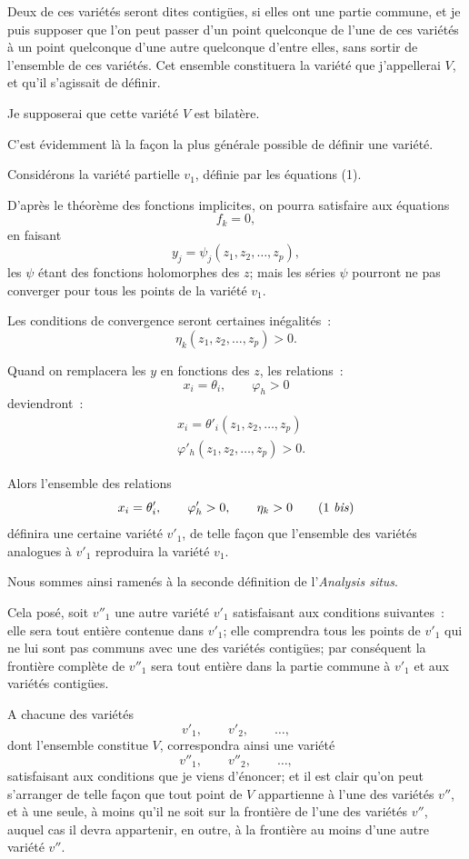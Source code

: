 \documentclass{article}
\begin{document}
Deux de ces variétés seront dites contigües, si elles ont une partie commune, et je puis supposer que l'on peut passer d'un point quelconque de l'une de ces variétés à un point quelconque d'une autre quelconque d'entre elles, sans sortir de l'ensemble de ces variétés. Cet ensemble constituera la variété que j'appellerai $V$, et qu'il s'agissait de définir.

Je supposerai que cette variété $V$ est bilatère.

C'est évidemment là la façon la plus générale possible de définir une variété.

Considérons la variété partielle $v_{1}$, définie par les équations (1).

D'après le théorème des fonctions implicites, on pourra satisfaire aux équations
\[ f_{k} = 0, \]
en faisant
\[ y_{j} = \psi_{j}(z_{1}, z_{2}, \ldots, z_{p}), \]
les $\psi$ étant des fonctions holomorphes des $z$; mais les séries $\psi$ pourront ne pas converger pour tous les points de la variété $v_{1}$.

Les conditions de convergence seront certaines inégalités~:
\[ \eta_{k}(z_{1}, z_{2}, \ldots, z_{p}) > 0. \]

Quand on remplacera les $y$ en fonctions des $z$, les relations~:
\[ x_{i} = \theta_{i}, \qquad \varphi_{h} > 0 \]
deviendront~:
\[ \begin{aligned} &x_{i} = \theta'_{i}(z_{1}, z_{2}, \ldots, z_{p})\\ &\varphi'_{h}(z_{1}, z_{2}, \ldots, z_{p}) > 0. \end{aligned} \]

Alors l'ensemble des relations
\[ x_{i} = \theta'_{i}, \qquad \varphi'_{h} > 0, \qquad \eta_{k} > 0 \tag{1 \textit{bis}} \]
définira une certaine variété $v'_{1}$, de telle façon que l'ensemble des variétés analogues à $v'_{1}$ reproduira la variété $v_{1}$.


Nous sommes ainsi ramenés à la seconde définition de l'\emph{Analysis situs}.

Cela posé, soit $v''_{1}$ une autre variété $v'_{1}$ satisfaisant aux conditions suivantes~: elle sera tout entière contenue dans $v'_{1}$; elle comprendra tous les points de $v'_{1}$ qui ne lui sont pas communs avec une des variétés contigües; par conséquent la frontière complète de $v''_{1}$ sera tout entière dans la partie commune à $v'_{1}$ et aux variétés contigües.

A chacune des variétés
\[ v'_{1}, \qquad v'_{2}, \qquad \ldots, \]
dont l'ensemble constitue $V$, correspondra ainsi une variété
\[ v''_{1}, \qquad v''_{2}, \qquad \ldots, \]
satisfaisant aux conditions que je viens d'énoncer; et il est clair qu'on peut s'arranger de telle façon que tout point de $V$ appartienne à l'une des variétés $v''$, et à une seule, à moins qu'il ne soit sur la frontière de l'une des variétés $v''$, auquel cas il devra appartenir, en outre, à la frontière au moins d'une autre variété $v''$.
\end{document}
